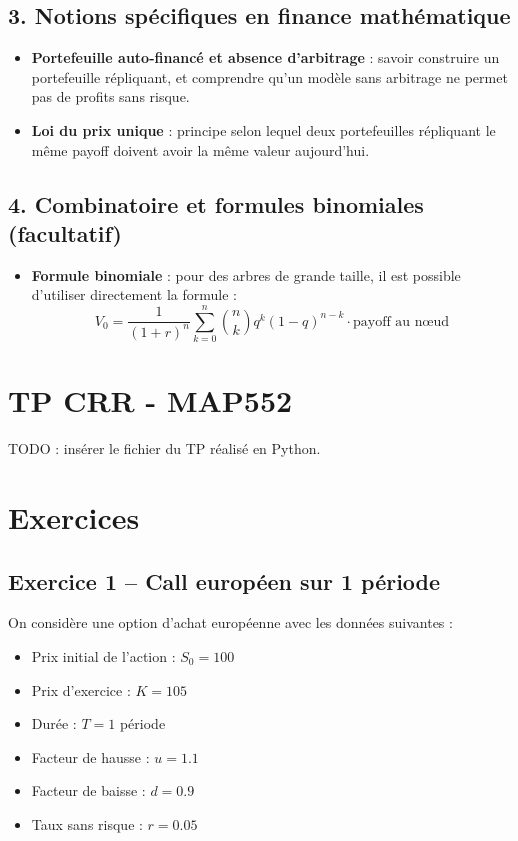 \documentclass[12pt,a4paper]{article}
\begin{document}
\subsection*{3. Notions spécifiques en finance mathématique}

\begin{itemize}
    \item \textbf{Portefeuille auto-financé et absence d’arbitrage} : savoir construire un portefeuille répliquant, et comprendre qu’un modèle sans arbitrage ne permet pas de profits sans risque.
    \item \textbf{Loi du prix unique} : principe selon lequel deux portefeuilles répliquant le même payoff doivent avoir la même valeur aujourd’hui.
\end{itemize}

\subsection*{4. Combinatoire et formules binomiales (facultatif)}

\begin{itemize}
    \item \textbf{Formule binomiale} : pour des arbres de grande taille, il est possible d’utiliser directement la formule :
    \[
    V_0 = \frac{1}{(1 + r)^n} \sum_{k=0}^{n} \binom{n}{k} q^k (1-q)^{n-k} \cdot \text{payoff au nœud}
    \]
\end{itemize}

\section{TP CRR - MAP552}
TODO : insérer le fichier du TP réalisé en Python.

\section{Exercices}

\subsection*{Exercice 1 -- Call européen sur 1 période}
On considère une option d’achat européenne avec les données suivantes :

\begin{itemize}
    \item Prix initial de l’action : $S_0 = 100$
    \item Prix d’exercice : $K = 105$
    \item Durée : $T = 1$ période
    \item Facteur de hausse : $u = 1.1$
    \item Facteur de baisse : $d = 0.9$
    \item Taux sans risque : $r = 0.05$
\end{itemize}
\end{document}
